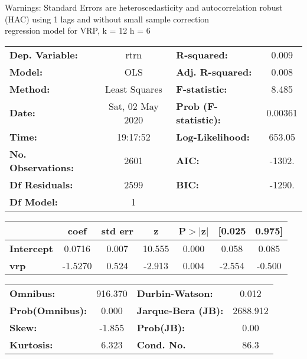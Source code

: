 Warnings: \newline
 [1] Standard Errors are heteroscedasticity and autocorrelation robust (HAC) using 1 lags and without small sample correction\\ 

regression model for VRP, k = 12 h = 6\begin{center}
\begin{tabular}{lclc}
\toprule
\textbf{Dep. Variable:}    &       rtrn       & \textbf{  R-squared:         } &     0.009   \\
\textbf{Model:}            &       OLS        & \textbf{  Adj. R-squared:    } &     0.008   \\
\textbf{Method:}           &  Least Squares   & \textbf{  F-statistic:       } &     8.485   \\
\textbf{Date:}             & Sat, 02 May 2020 & \textbf{  Prob (F-statistic):} &  0.00361    \\
\textbf{Time:}             &     19:17:52     & \textbf{  Log-Likelihood:    } &    653.05   \\
\textbf{No. Observations:} &        2601      & \textbf{  AIC:               } &    -1302.   \\
\textbf{Df Residuals:}     &        2599      & \textbf{  BIC:               } &    -1290.   \\
\textbf{Df Model:}         &           1      & \textbf{                     } &             \\
\bottomrule
\end{tabular}
\begin{tabular}{lcccccc}
                   & \textbf{coef} & \textbf{std err} & \textbf{z} & \textbf{P$> |$z$|$} & \textbf{[0.025} & \textbf{0.975]}  \\
\midrule
\textbf{Intercept} &       0.0716  &        0.007     &    10.555  &         0.000        &        0.058    &        0.085     \\
\textbf{vrp}       &      -1.5270  &        0.524     &    -2.913  &         0.004        &       -2.554    &       -0.500     \\
\bottomrule
\end{tabular}
\begin{tabular}{lclc}
\textbf{Omnibus:}       & 916.370 & \textbf{  Durbin-Watson:     } &    0.012  \\
\textbf{Prob(Omnibus):} &   0.000 & \textbf{  Jarque-Bera (JB):  } & 2688.912  \\
\textbf{Skew:}          &  -1.855 & \textbf{  Prob(JB):          } &     0.00  \\
\textbf{Kurtosis:}      &   6.323 & \textbf{  Cond. No.          } &     86.3  \\
\bottomrule
\end{tabular}
\end{center}

